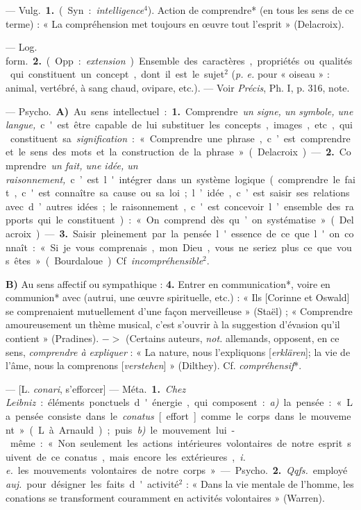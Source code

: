 \begin{itemize}[leftmargin=1cm, label=, itemsep=11pt]
 — \si{Vulg.} {\bf 1.} (Syn. :
{\it intelligence}$^4$). Action de comprendre*
(en tous les sens de ce terme) : « La
compréhension met toujours en
œuvre tout l'esprit » (Delacroix).

— \si{Log. form.} {\bf 2.} (Opp. : {\it extension}). Ensemble des caractères, propriétés ou qualités qui constituent
un concept, dont il est le sujet$^2$
({\it p. e.} pour « oiseau » : animal, vertébré, à sang chaud, ovipare, etc.).
— Voir {\it Précis}, Ph. I, p. 316, note.

 — \si{Psycho.} {\bf A)} Au sens
intellectuel : {\bf 1.} Comprendre {\it un
signe, un symbole, une langue,} c'est
être capable de lui substituer les
concepts, images, etc., qui constituent sa {\it signification} : « Comprendre
une phrase, c’est comprendre et le
sens des mots et la construction de
la phrase » (Delacroix). — {\bf 2.} Comprendre
{\it un fait, une idée, un raisonnement,} c’est l'intégrer dans un système logique (comprendre le fait,
c'est connaître sa cause ou sa loi;
l’idée, c’est saisir ses relations avec
d’autres idées; le raisonnement,
c'est concevoir l’ensemble des rapports qui le constituent) : « On comprend dès qu’on systématise » (Delacroix). — {\bf 3.} Saisir pleinement par
la pensée l'essence de ce que l'on
connaît : « Si je vous comprenais,
mon Dieu, vous ne seriez plus ce que
vous êtes » (Bourdaloue). Cf. {\it incompréhensible}$^2$.

{\bf B)} Au sens affectif ou sympathique : {\bf 4.} Entrer en communication*, voire en communion* avec
(autrui, une œuvre spirituelle, etc.) :
« Ils [Corinne et Oswald] se comprenaient mutuellement d’une façon
merveilleuse » (Staël) ; « Comprendre
amoureusement un thème musical,
c'est s'ouvrir à la suggestion d'évasion qu'il contient » (Pradines).
$->$ (Certains auteurs, {\it not.} allemands, opposent, en ce sens, {\it comprendre à expliquer} : « La nature,
nous l'expliquons [{\it erklären}]; la vie
de l'âme, nous la comprenons [{\it verstehen}] » (Dilthey). Cf. {\it compréhensif}*.

 — [L. {\it conari}, s’efforcer] — \si{Méta.} {\bf 1.} {\it Chez Leibniz} : éléments ponctuels d'énergie, qui composent : {\it a)} la pensée : « La pensée
consiste dans le {\it conatus} [effort]
comme le corps dans le mouvement » (L. à Arnauld); puis {\it b)} le
mouvement lui-même : « Non seulement les actions intérieures volontaires de notre esprit suivent de ce
conatus, mais encore les extérieures,
{\it i. e.} les mouvements volontaires de
notre corps ». — \si{Psycho.} {\bf 2.} {\it Qqfs.}
employé {\it auj.} pour désigner les faits
d'activité$^2$ : « Dans la vie mentale de
l'homme, les conations se transforment
couramment en activités volontaires » (Warren).


\end{itemize}
